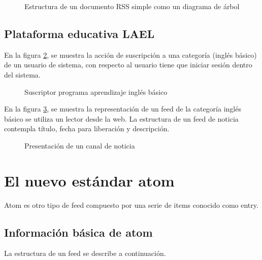 \begin{figure}[h!]
	\centering
	\caption{Estructura de un documento RSS simple como un diagrama de árbol}
	\label{fig:Estructura de un documento RSS simple como un diagrama de árbol}
\end{figure}


\subsection{Plataforma educativa LAEL}

En la figura \ref{fig:Suscriptor programa aprendizaje inglés básico}, se
muestra la acción de suscripción a una categoría (inglés básico) de un
usuario de sistema, con respecto al usuario tiene que iniciar sesión dentro 
del sistema. 

\begin{figure}[!ht]
	\centering
	\caption{Suscriptor programa aprendizaje inglés básico}
	\label{fig:Suscriptor programa aprendizaje inglés básico}
\end{figure}

En la figura \ref{fig:Presentación de un canal de noticia}, se muestra la
representación de un feed de la categoría inglés básico se utiliza un lector
desde la web. La estructura de un feed de noticia contempla título, fecha
para liberación y descripción.
 
\begin{figure}[!ht]
	\centering
	\caption{Presentación de un canal de noticia}
	\label{fig:Presentación de un canal de noticia}
\end{figure}

\section{El nuevo estándar atom}

Atom es otro tipo de feed compuesto por una serie de items
conocido como entry.

\subsection{Información básica de atom}

La estructura de un feed se describe a continuación.

